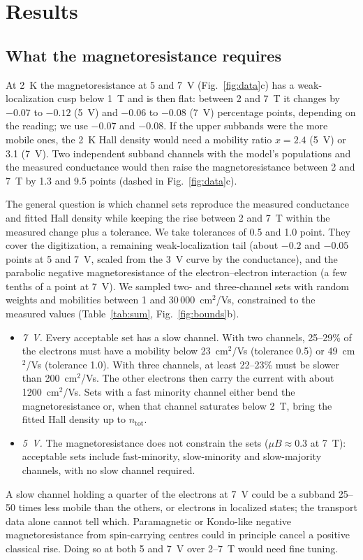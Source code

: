 \documentclass[11pt]{article}
\newcommand{\ntot}{n_\mathrm{tot}}
\begin{document}
\section{Results}
\subsection{What the magnetoresistance requires}\label{sec:mr}
At 2~K the magnetoresistance at 5 and 7~V (Fig.~\ref{fig:data}c) has a weak-localization cusp below 1~T and is then flat: between 2 and 7~T it changes by $-0.07$ to $-0.12$ (5~V) and $-0.06$ to $-0.08$ (7~V) percentage points, depending on the reading; we use $-0.07$ and $-0.08$. If the upper subbands were the more mobile ones, the 2~K Hall density would need a mobility ratio $x=2.4$ (5~V) or 3.1 (7~V). Two independent subband channels with the model's populations and the measured conductance would then raise the magnetoresistance between 2 and 7~T by 1.3 and 9.5 points (dashed in Fig.~\ref{fig:data}c).

The general question is which channel sets reproduce the measured conductance and fitted Hall density while keeping the rise between 2 and 7~T within the measured change plus a tolerance. We take tolerances of 0.5 and 1.0 point. They cover the digitization, a remaining weak-localization tail (about $-0.2$ and $-0.05$ points at 5 and 7~V, scaled from the 3~V curve by the conductance), and the parabolic negative magnetoresistance of the electron--electron interaction (a few tenths of a point at 7~V). We sampled two- and three-channel sets with random weights and mobilities between 1 and 30\,000~cm$^2$/Vs, constrained to the measured values (Table~\ref{tab:sum}, Fig.~\ref{fig:bounds}b).
\begin{itemize}
\item \emph{7~V.} Every acceptable set has a slow channel. With two channels, 25--29\% of the electrons must have a mobility below 23~cm$^2$/Vs (tolerance 0.5) or 49~cm$^2$/Vs (tolerance 1.0). With three channels, at least 22--23\% must be slower than 200~cm$^2$/Vs. The other electrons then carry the current with about 1200~cm$^2$/Vs. Sets with a fast minority channel either bend the magnetoresistance or, when that channel saturates below 2~T, bring the fitted Hall density up to $\ntot$.
\item \emph{5~V.} The magnetoresistance does not constrain the sets ($\mu B\approx0.3$ at 7~T): acceptable sets include fast-minority, slow-minority and slow-majority channels, with no slow channel required.
\end{itemize}
A slow channel holding a quarter of the electrons at 7~V could be a subband 25--50 times less mobile than the others, or electrons in localized states; the transport data alone cannot tell which. Paramagnetic or Kondo-like negative magnetoresistance from spin-carrying centres could in principle cancel a positive classical rise. Doing so at both 5 and 7~V over 2--7~T would need fine tuning.
\end{document}
